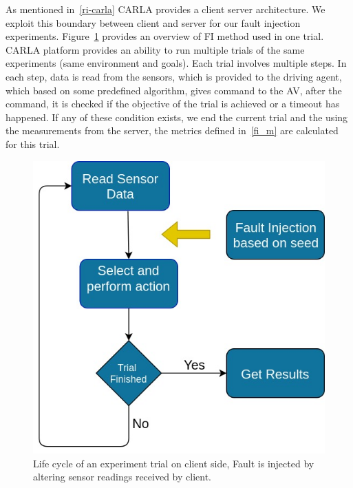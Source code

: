  As mentioned in~\ref{ri-carla} CARLA provides a client server architecture. We exploit this boundary between client and server for our fault injection experiments. Figure~\ref{fig:FI_method} provides an overview of FI method used in one trial. CARLA platform provides an ability to run multiple trials of the same experiments (same environment and goals). Each trial involves multiple steps. In each step, data is read from the sensors, which is provided to the driving agent, which based on some predefined algorithm, gives command to the AV, after the command, it is checked if the objective of the trial is achieved or a timeout has happened. If any of these condition exists, we end the current trial and the using the measurements from the server, the metrics defined in~\ref{fi_m} are calculated for this trial.
 
 \begin{figure}  
 	\vspace{-0.5em}
 	\centering
 	\includegraphics[scale=0.3]{FI_method}
 	\vspace{-0.5em}
 	\caption{Life cycle of an experiment trial on client side, Fault is injected by altering sensor readings received by client.}
 	\label{fig:FI_method}
 	\vspace{-1.5em}
 \end{figure}
 
